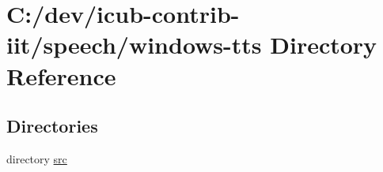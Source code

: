 \section{C\+:/dev/icub-\/contrib-\/iit/speech/windows-\/tts Directory Reference}
\label{dir_02735ddd5f59dfdbb14c9c5168ff53c8}
\subsection*{Directories}
\begin{DoxyCompactItemize}
\item 
directory \hyperlink{dir_f193454629d50d9e0d1b2474421923c7}{src}
\end{DoxyCompactItemize}
